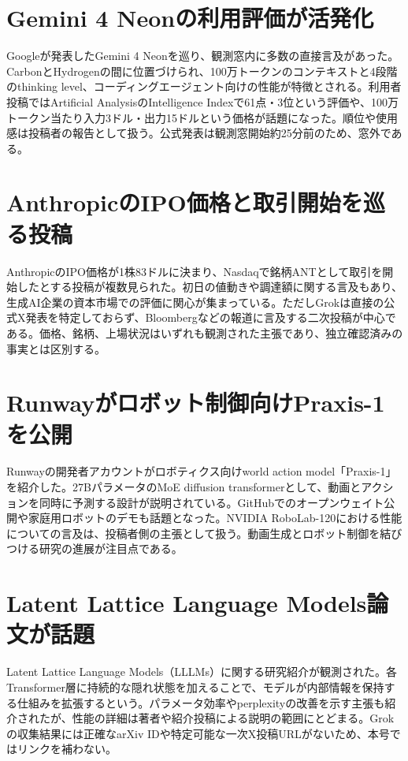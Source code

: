 \section{Gemini 4 Neonの利用評価が活発化}
Googleが発表したGemini 4 Neonを巡り、観測窓内に多数の直接言及があった。CarbonとHydrogenの間に位置づけられ、100万トークンのコンテキストと4段階のthinking level、コーディングエージェント向けの性能が特徴とされる。利用者投稿ではArtificial AnalysisのIntelligence Indexで61点・3位という評価や、100万トークン当たり入力3ドル・出力15ドルという価格が話題になった。順位や使用感は投稿者の報告として扱う。公式発表は観測窓開始約25分前のため、窓外である。

\section{AnthropicのIPO価格と取引開始を巡る投稿}
AnthropicのIPO価格が1株83ドルに決まり、Nasdaqで銘柄ANTとして取引を開始したとする投稿が複数見られた。初日の値動きや調達額に関する言及もあり、生成AI企業の資本市場での評価に関心が集まっている。ただしGrokは直接の公式X発表を特定しておらず、Bloombergなどの報道に言及する二次投稿が中心である。価格、銘柄、上場状況はいずれも観測された主張であり、独立確認済みの事実とは区別する。

\section{Runwayがロボット制御向けPraxis-1を公開}
Runwayの開発者アカウントがロボティクス向けworld action model「Praxis-1」を紹介した。27BパラメータのMoE diffusion transformerとして、動画とアクションを同時に予測する設計が説明されている。GitHubでのオープンウェイト公開や家庭用ロボットのデモも話題となった。NVIDIA RoboLab-120における性能についての言及は、投稿者側の主張として扱う。動画生成とロボット制御を結びつける研究の進展が注目点である。

\section{Latent Lattice Language Models論文が話題}
Latent Lattice Language Models（LLLMs）に関する研究紹介が観測された。各Transformer層に持続的な隠れ状態を加えることで、モデルが内部情報を保持する仕組みを拡張するという。パラメータ効率やperplexityの改善を示す主張も紹介されたが、性能の詳細は著者や紹介投稿による説明の範囲にとどまる。Grokの収集結果には正確なarXiv IDや特定可能な一次X投稿URLがないため、本号ではリンクを補わない。

